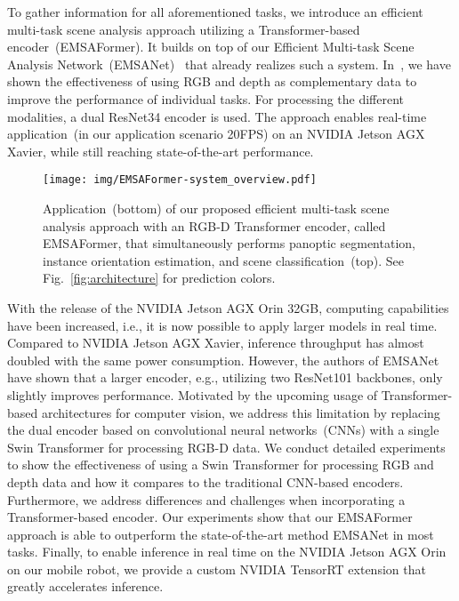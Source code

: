\documentclass[conference]{IEEEtran}
\begin{document}
To gather information for all aforementioned tasks, we introduce an efficient multi-task scene analysis approach utilizing a Transformer-based encoder~(EMSAFormer).
It builds on top of our Efficient Multi-task Scene Analysis Network~(EMSANet)~\cite{emsanet2022ijcnn} that already realizes such a system.
In~\cite{emsanet2022ijcnn}, we have shown the effectiveness of using RGB and depth as complementary data to improve the performance of individual tasks.
For processing the different modalities, a dual ResNet34 encoder is used.
The approach enables real-time application~(in our application scenario 20FPS) on an NVIDIA Jetson AGX Xavier, while still reaching state-of-the-art performance.
\begin{figure}[!t]
    \vspace{0.5mm}
	\centering
	\texttt{[image: img/EMSAFormer-system\_overview.pdf]}
	\vspace{-12.5mm}
	\caption{Application~(bottom) of our proposed efficient multi-task scene analysis approach with an RGB-D Transformer encoder, called EMSAFormer, that simultaneously performs panoptic segmentation, instance orientation estimation, and scene classification~(top).
        See Fig.~\ref{fig:architecture} for prediction colors.
}
	\label{fig:eyecatcher}
	\vspace{-5mm}
\end{figure}
With the release of the NVIDIA Jetson AGX Orin 32GB, computing capabilities have been increased, i.e., it is now possible to apply larger models in real time.
Compared to NVIDIA Jetson AGX Xavier, inference throughput has almost doubled with the same power consumption.
However, the authors of EMSANet have shown that a larger encoder, e.g., utilizing two ResNet101 backbones, only slightly improves performance.
Motivated by the upcoming usage of Transformer-based architectures for computer vision, we address this limitation by replacing the dual encoder based on convolutional neural networks~(CNNs) with a single Swin Transformer for processing RGB-D data.
We conduct detailed experiments to show the effectiveness of using a Swin Transformer for processing RGB and depth data and how it compares to the traditional CNN-based encoders.
Furthermore, we address differences and challenges when incorporating a Transformer-based encoder.
Our experiments show that our EMSAFormer approach is able to outperform the state-of-the-art method EMSANet in most tasks.
Finally, to enable inference in real time on the NVIDIA Jetson AGX Orin on our mobile robot, we provide a custom NVIDIA TensorRT extension that greatly accelerates inference.
\end{document}
